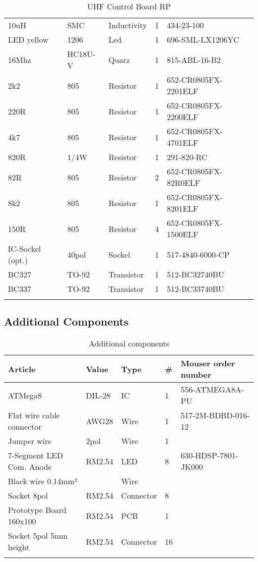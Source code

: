 \documentclass[12pt, a4paper]{report}
\begin{document}
\begin{longtable}{ *{5}{| l } | }
10uH & SMC & Inductivity & 1 & 434-23-100 \\
LED yellow & 1206 & Led & 1 & 696-SML-LX1206YC \\
16Mhz & HC18U-V & Quarz & 1 & 815-ABL-16-B2 \\
2k2 & 805 & Resistor & 1 & 652-CR0805FX-2201ELF \\
220R & 805 & Resistor & 1 & 652-CR0805FX-2200ELF \\
4k7 & 805 & Resistor & 1 & 652-CR0805FX-4701ELF \\
820R & 1/4W & Resistor & 1 & 291-820-RC \\
82R & 805 & Resistor & 2 & 652-CR0805FX-82R0ELF \\
8k2 & 805 & Resistor & 1 & 652-CR0805FX-8201ELF \\
150R & 805 & Resistor & 4 & 652-CR0805FX-1500ELF \\
IC-Sockel (opt.) & 40pol & Sockel & 1 & 517-4840-6000-CP \\
BC327 & TO-92 & Transistor & 1 & 512-BC32740BU \\
BC337 & TO-92 & Transistor & 1 & 512-BC33740BU \\
\hline
\caption {UHF Control Board RP}
\end {longtable}

\subsection{Additional Components}
\begin{longtable}{ *{5}{| l } | }
\hline
\textbf{Article} & \textbf{Value} & \textbf{Type} & \textbf{\#} & \textbf{Mouser order number} \\
\hline
\endhead
ATMega8 & DIL-28 & IC & 1 & 556-ATMEGA8A-PU \\
Flat wire cable connector & AWG28 & Wire & 1 & 517-2M-BDBD-016-12 \\
Jumper wire & 2pol & Wire & 1 &  \\
7-Segment LED Com. Anode & RM2.54 & LED & 8 & 630-HDSP-7801-JK000 \\
Black wire 0.14mm² &  & Wire &  &  \\
Socket 8pol & RM2.54 & Connector & 8 &  \\
Prototype Board 160x100 & RM2.54 & PCB & 1 &  \\
Socket 5pol 5mm height & RM2.54 & Connector & 16 &  \\
\hline
\caption {Additional components}
\end {longtable}
\end{document}
